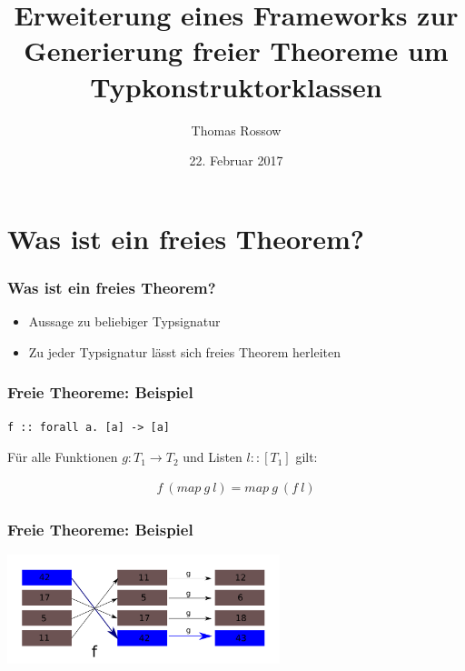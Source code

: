 \documentclass{beamer}
\title{Erweiterung eines Frameworks zur Generierung freier Theoreme um Typkonstruktorklassen}
\author{Thomas Rossow}
\date{22. Februar 2017}
\begin{document}
\maketitle
\frame{\tableofcontents}

\section{Was ist ein freies Theorem?}

\begin{frame}
\frametitle{Was ist ein freies Theorem?}

\begin{itemize}
\item Aussage zu beliebiger Typsignatur
\item Zu jeder Typsignatur lässt sich freies Theorem herleiten
\end{itemize}
\end{frame}


\begin{frame}[fragile]
\frametitle{Freie Theoreme: Beispiel}
\begin{verbatim}
f :: forall a. [a] -> [a]
\end{verbatim}

\pause

Für alle Funktionen $g : T_1 \rightarrow T_2$ und Listen $l :: [T_1]$ gilt:

\begin{align*}
f\ (map\ g\ l) = map\ g\ (f\ l)
\end{align*}
\end{frame}


\begin{frame}
\frametitle{Freie Theoreme: Beispiel}

\begin{center}
\includegraphics[width=300px]{fmapg}
\end{center}

\end{frame}
\end{document}
